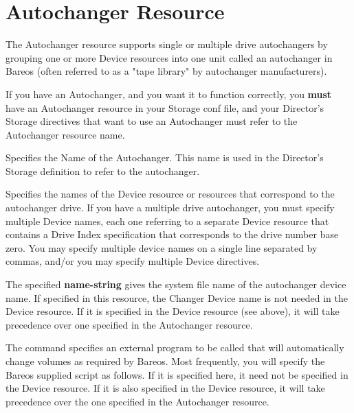 \section{Autochanger Resource}
\label{AutochangerRes}
\label{AutochangerResource1}


The Autochanger resource supports single or multiple drive
autochangers by grouping one or more Device resources
into one unit called an autochanger in Bareos (often referred to
as a "tape library" by autochanger manufacturers).

If you have an Autochanger, and you want it to function correctly,
you {\bf must} have an Autochanger resource in your Storage
conf file, and your Director's Storage directives that want to
use an Autochanger must refer to the Autochanger resource name.

\begin{description}
Specifies the Name of the Autochanger.  This name is used in the
Director's Storage definition to refer to the autochanger.

Specifies the names of the Device resource or resources that correspond
to the autochanger drive.  If you have a multiple drive autochanger, you
must specify multiple Device names, each one referring to a separate
Device resource that contains a Drive Index specification that
corresponds to the drive number base zero.  You may specify multiple
device names on a single line separated by commas, and/or you may
specify multiple Device directives.

The specified {\bf name-string} gives the system file name of the  autochanger
device name. If specified in this resource, the Changer Device name
is not needed in the Device resource. If it is specified in the Device
resource (see above), it will take precedence over one specified in
the Autochanger resource.

The command specifies an external program to be called  that will
automatically change volumes as required by Bareos.  Most frequently,
you will specify the Bareos supplied   script as follows.
If it is specified here, it need not be specified in the Device
resource. If it is also specified in the Device resource, it will take
precedence over the one specified in the Autochanger resource.
\end{description}

